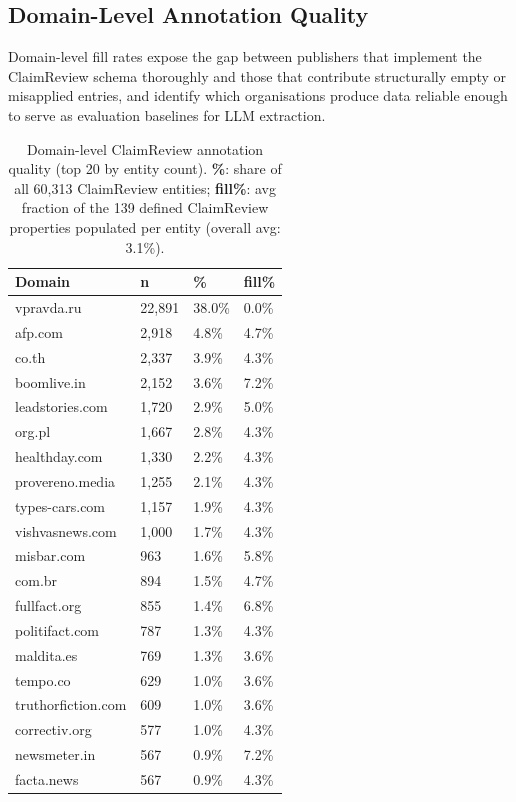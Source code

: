 \documentclass[11pt,a4paper]{article}
\begin{document}
\subsection{Domain-Level Annotation Quality}
\label{sec:cr:domains}

Domain-level fill rates expose the gap between publishers that implement the
ClaimReview schema thoroughly and those that contribute structurally empty or
misapplied entries, and identify which organisations produce data reliable
enough to serve as evaluation baselines for LLM extraction.

\begin{table}[H]
\centering
\caption{Domain-level ClaimReview annotation quality (top 20 by entity count).
  \textbf{\%}: share of all 60{,}313 ClaimReview entities;
  \textbf{fill\%}: avg fraction of the 139 defined ClaimReview properties
  populated per entity (overall avg: 3.1\%).}
\label{tab:cr_domains}
\small
\begin{tabular}{L{3.2cm} R{1.2cm} R{1.0cm} R{1.2cm}}
\toprule
\textbf{Domain} & \textbf{n} & \textbf{\%} & \textbf{fill\%} \\
\midrule
vpravda.ru         & 22{,}891 & 38.0\% & 0.0\% \\
afp.com            &  2{,}918 &  4.8\% & 4.7\% \\
co.th              &  2{,}337 &  3.9\% & 4.3\% \\
boomlive.in        &  2{,}152 &  3.6\% & 7.2\% \\
leadstories.com    &  1{,}720 &  2.9\% & 5.0\% \\
org.pl             &  1{,}667 &  2.8\% & 4.3\% \\
healthday.com      &  1{,}330 &  2.2\% & 4.3\% \\
provereno.media    &  1{,}255 &  2.1\% & 4.3\% \\
types-cars.com     &  1{,}157 &  1.9\% & 4.3\% \\
vishvasnews.com    &  1{,}000 &  1.7\% & 4.3\% \\
misbar.com         &    963   &  1.6\% & 5.8\% \\
com.br             &    894   &  1.5\% & 4.7\% \\
fullfact.org       &    855   &  1.4\% & 6.8\% \\
politifact.com     &    787   &  1.3\% & 4.3\% \\
maldita.es         &    769   &  1.3\% & 3.6\% \\
tempo.co           &    629   &  1.0\% & 3.6\% \\
truthorfiction.com &    609   &  1.0\% & 3.6\% \\
correctiv.org      &    577   &  1.0\% & 4.3\% \\
newsmeter.in       &    567   &  0.9\% & 7.2\% \\
facta.news         &    567   &  0.9\% & 4.3\% \\
\bottomrule
\end{tabular}
\end{table}
\end{document}
